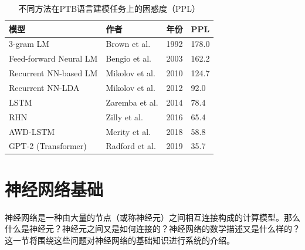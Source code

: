 \begin{table}[htp]
\centering
\caption{不同方法在PTB语言建模任务上的困惑度（PPL）}
\label{tab:5-1}
\small
\begin{tabular}{l | l l l}
\rule{0pt}{15pt}     模型 & 作者 & 年份 & PPL  \\
\hline
\rule{0pt}{15pt}     3-gram LM\cite{brown1992class} & Brown et al. & 1992 & 178.0  \\
\rule{0pt}{15pt}     Feed-forward Neural LM\cite{bengio2003neural} & Bengio et al. & 2003 & 162.2  \\
\rule{0pt}{15pt}     Recurrent NN-based LM\cite{mikolov2010recurrent} & Mikolov et al. & 2010 & 124.7  \\
\rule{0pt}{15pt}     Recurrent NN-LDA\cite{mikolov2012context} & Mikolov et al. & 2012 & 92.0  \\
\rule{0pt}{15pt}     LSTM \cite{zaremba2014recurrent}& Zaremba et al. & 2014 & 78.4  \\
\rule{0pt}{15pt}     RHN\cite{zilly2016recurrent} & Zilly et al. & 2016 & 65.4  \\
\rule{0pt}{15pt}     AWD-LSTM\cite{merity2017regularizing} & Merity et al. & 2018 & 58.8  \\
\rule{0pt}{15pt}     GPT-2 (Transformer)\cite{radford2019language} & Radford et al. & 2019 & 35.7  \\
\end{tabular}
\end{table}


\sectionnewpage
\section{神经网络基础}

\parinterval 神经网络是一种由大量的节点（或称神经元）之间相互连接构成的计算模型。那么什么是神经元？神经元之间又是如何连接的？神经网络的数学描述又是什么样的？这一节将围绕这些问题对神经网络的基础知识进行系统的介绍。


